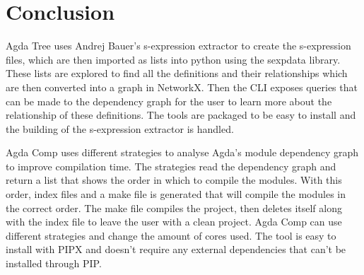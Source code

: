 \section{Conclusion}

Agda Tree uses Andrej Bauer's s-expression extractor to create the s-expression
files, which are then imported as lists into python using the sexpdata library.
These lists are explored to find all the definitions and their relationships
which are then converted into a graph in NetworkX.  Then the CLI exposes
queries that can be made to the dependency graph for the user to learn more
about the relationship of these definitions. The tools are packaged to be easy
to install and the building of the s-expression extractor is handled.

Agda Comp uses different strategies to analyse Agda's module dependency graph
to improve compilation time. The strategies read the dependency graph and
return a list that shows the order in which to compile the modules. With this
order, index files and a make file is generated that will compile the modules
in the correct order. The make file compiles the project, then deletes itself
along with the index file to leave the user with a clean project. Agda Comp can
use different strategies and change the amount of cores used. The tool is easy
to install with PIPX and doesn't require any external dependencies that can't
be installed through PIP.




